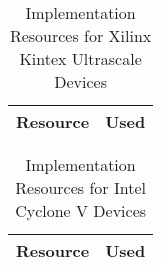 \ifnum{}
\begin{table}[H]
  \begin{center}
    \begin{tabular}{|l|r|}
      \hline
%      
      \rowcolor{iob-green}
      \textbf{Resource}  & \textbf{Used} \\
      \hline
      \hline

       

    \end{tabular}
    \caption{Implementation Resources for Xilinx Kintex Ultrascale Devices}
    \label{tab:res-xil}
  \end{center}
\end{table}
\fi


\ifnum{}
\begin{table}[H]
  \begin{center}
    \begin{tabular}{|l|r|}
      \hline

      \rowcolor{iob-green}
      \textbf{Resource}  & \textbf{Used} \\
      \hline
      \hline

       
        
    \end{tabular}
    \caption{Implementation Resources for Intel Cyclone V Devices}
    \label{tab:res-alt}
  \end{center}
\end{table}
\fi
